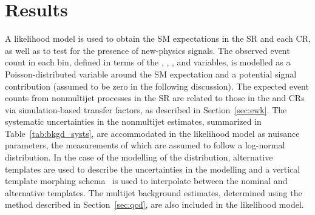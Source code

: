 \section{Results}
\label{sec:result}

A likelihood model is used to obtain the SM expectations in the SR and
each CR, as well as to test for the presence of new-physics
signals. The observed event count in each bin, defined in terms of the
\njet, \nb, \scalht, and \mht variables, is modelled as a
Poisson-distributed variable around the SM expectation and a potential
signal contribution (assumed to be zero in the following
discussion). The expected event counts from nonmultijet processes in
the SR are related to those in the \mj and \mmj CRs via
simulation-based transfer factors, as described in
Section~\ref{sec:ewk}. The systematic uncertainties in the nonmultijet
estimates, summarized in Table~\ref{tab:bkgd_systs}, are accommodated
in the likelihood model as nuisance parameters, the measurements of
which are assumed to follow a log-normal distribution. In the case of
the modelling of the \mht distribution, alternative templates are used
to describe the uncertainties in the modelling and a vertical template
morphing schema~\cite{Prosper:2011zz, Khachatryan:2016dvc} is used to
interpolate between the nominal and alternative templates. The
multijet background estimates, determined using the method described
in Section~\ref{sec:qcd}, are also included in the likelihood model.

